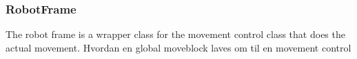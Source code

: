 \documentclass[Main]{subfiles}
\begin{document}
	\subsubsection{RobotFrame} %
	\label{subsub:software_robotframe}
	
	The robot frame is a wrapper class for the movement control class that does the actual movement.
	Hvordan en global moveblock laves om til en movement control
	
\end{document}
